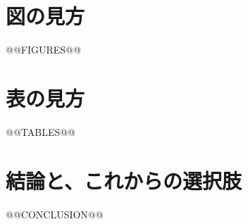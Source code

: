 \documentclass[paper=a4paper,fontsize=10.5pt,line_length=44zw,number_of_lines=38]{jlreq}
\begin{document}
\section{図の見方}

@@FIGURES@@

\section{表の見方}

@@TABLES@@

\section{結論と、これからの選択肢}

@@CONCLUSION@@
\end{document}
